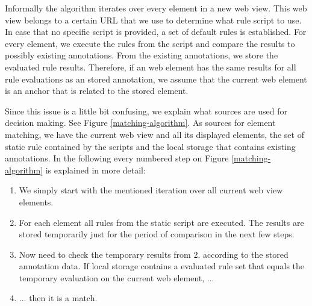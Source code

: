 Informally the algorithm iterates over every element in a new web view. This web view belongs to a certain URL that we use to determine what rule script to use. In case that no specific script is provided, a set of default rules is established. For every element, we execute the rules from the script and compare the results to possibly existing annotations. From the existing annotations, we store the evaluated rule results. Therefore, if an web element has the same results for all rule evaluations as an stored annotation, we assume that the current web element is an anchor that is related to the stored element. 

Since this issue is a little bit confusing, we explain what sources are used for decision making. See Figure \ref{matching-algorithm}. As sources for element matching, we have the current web view and all its displayed elements, the set of static rule contained by the scripts and the local storage that contains existing annotations. In the following every numbered step on Figure \ref{matching-algorithm} is explained in more detail:

\begin{enumerate}
\item We simply start with the mentioned iteration over all current web view elements. 

\item For each element all rules from the static script are executed. The results are stored temporarily just for the period of comparison in the next few steps.

\item Now need to check the temporary results from 2. according to the stored annotation data. If local storage contains a evaluated rule set that equals the temporary evaluation on the current web element, ...

\item ... then it is a match. 
\end{enumerate}

